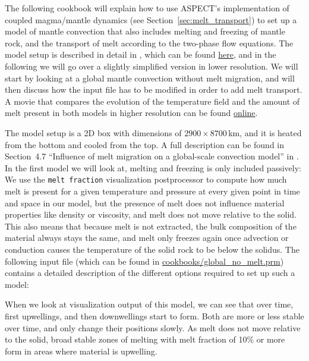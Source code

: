 \documentclass{article}
\newcommand{\aspect}{\textsc{ASPECT}}
\begin{document}
The following cookbook will explain how to use \aspect{}'s implementation of coupled magma/mantle dynamics
(see Section~\ref{sec:melt_transport}) to set up a model of mantle convection that also includes melting
and freezing of mantle rock, and the transport of melt according to the two-phase flow equations.
The model setup is described in detail in \cite{dannberg_melt}, which can be found \href{https://doi.org/10.1093/gji/ggw329}{here},
and in the following we will go over a slightly simplified version in lower resolution.
We will start by looking at a global mantle convection without melt migration, and will
then discuss how the input file has to be modified in order to add melt transport. A movie that compares
the evolution of the temperature field and the amount of melt present in both models in higher resolution can be found
\href{http://youtu.be/Kwyp4Jvx6MU}{online}.

The model setup is a 2D box with dimensions of $2900 \times 8700$\,km, and it is heated from the bottom and
cooled from the top. A full description can be found in Section~4.7 ``Influence of melt migration on a global-scale
convection model'' in \cite{dannberg_melt}.
In the first model we will look at, melting and freezing is only included passively: We use the \texttt{melt fraction} visualization postprocessor to compute how much melt is present for a given temperature and pressure at every given point in time and space in our model, but the presence of melt does not influence material properties like density or viscosity, and melt does not move relative to the solid. This also means that because melt is not extracted, the bulk composition of the material always stays the same, and melt only freezes again once advection or conduction causes the temperature of the solid rock to be below the solidus.
The following input file (which can be found in \url{cookbooks/global_no_melt.prm}) contains a detailed description of the
different options required to set up such a model:



When we look at visualization output of this model, we can see that over time, first upwellings, and then downwellings start to form. Both are more or less stable over time, and only change their positions slowly. As melt does not move relative to the solid, broad stable zones of melting with melt fraction of 10\% or more form in areas where material is upwelling.
\end{document}
